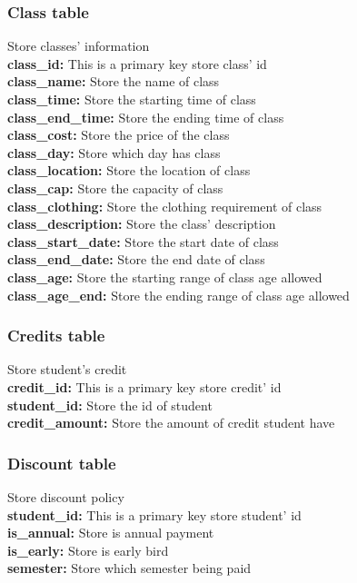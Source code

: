 \subsubsection{Class table}
Store classes' information\\
\textbf{class\_id:} This is a primary key store class' id\\
\textbf{class\_name:} Store the name of class \\
\textbf{class\_time:} Store the starting time of class\\
\textbf{class\_end\_time:} Store the ending time of class\\
\textbf{class\_cost:} Store the price of the class\\
\textbf{class\_day:} Store which day has class\\
\textbf{class\_location:} Store the location of class\\
\textbf{class\_cap:} Store the capacity of class\\
\textbf{class\_clothing:} Store the clothing requirement of class\\
\textbf{class\_description:} Store the class' description\\
\textbf{class\_start\_date:} Store the start date of class\\
\textbf{class\_end\_date:} Store the end date of class\\
\textbf{class\_age:} Store the starting range of class age allowed\\
\textbf{class\_age\_end:} Store the ending range of class age allowed

\subsubsection{Credits table}
Store student's credit\\
\textbf{credit\_id:} This is a primary key store credit' id\\
\textbf{student\_id:} Store the id of student \\
\textbf{credit\_amount:} Store the amount of credit student have\\

\subsubsection{Discount table}
Store discount policy\\
\textbf{student\_id:} This is a primary key store student' id\\
\textbf{is\_annual:} Store is annual payment \\
\textbf{is\_early:} Store is early bird\\
\textbf{semester:} Store which semester being paid\\

